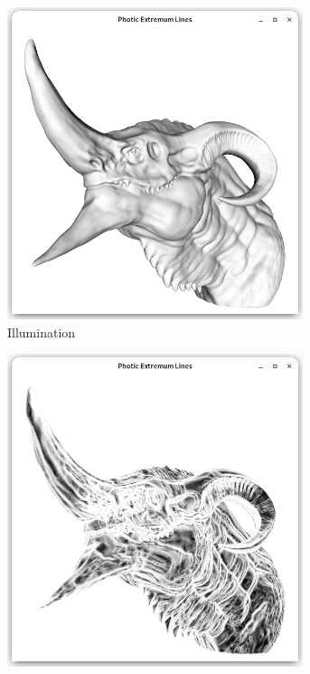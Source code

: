 \documentclass[9pt,fleqn,twoside,twocolumn]{stdglobal}
\begin{document}
\begin{figure}
    \centering
    \begin{subfigure}[b]{0.24\textwidth}
      \centering
      \includegraphics[width=0.95\textwidth,trim={15px 15 15 50},clip]{images/dragon-head-vertex-lighting.png}
      \caption{Illumination}
    \end{subfigure}%
    \hfill%
    \begin{subfigure}[b]{0.24\textwidth}
      \centering
      \includegraphics[width=0.95\textwidth,trim={15px 15 15 50},clip]{images/dragon-head-light-variation.png}

\end{subfigure}
\end{figure}
\end{document}
